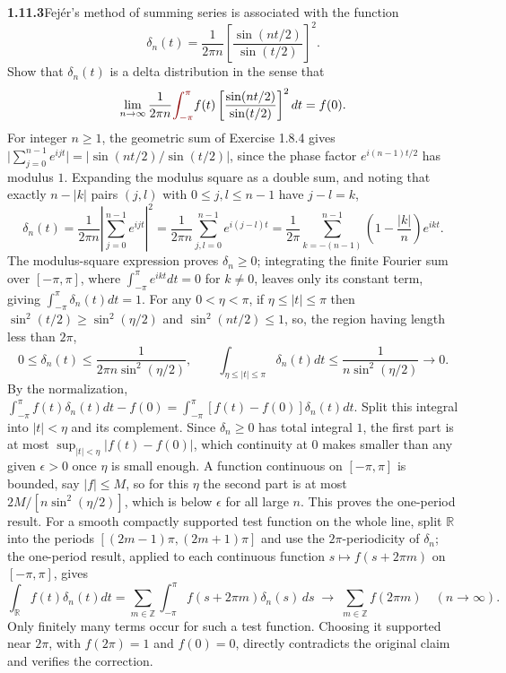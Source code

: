 \par\bigskip
\noindent\textbf{1.11.3}\quad Fej\'er's method of summing series is associated
with the function
\[
\delta_{n}(t)=\frac{1}{2\pi n}\left[\frac{\sin(nt/2)}{\sin(t/2)}\right]^{2}.
\]
Show that $\delta_{n}(t)$ is a delta distribution  in the sense that
\[
\lim_{n\to\infty}\frac{1}{2\pi n}\erratum{\int_{-\pi}^{\pi}}f(t)
\left[\frac{\sin(nt/2)}{\sin(t/2)}\right]^{2}dt=f(0).
\]
\solution
{}
For integer $n\ge1$, the geometric sum of Exercise 1.8.4 gives
$\bigl|\sum_{j=0}^{n-1}e^{ijt}\bigr|=|\sin(nt/2)/\sin(t/2)|$, since
the phase factor $e^{i(n-1)t/2}$ has modulus $1$. Expanding the
modulus square as a double sum, and noting that exactly $n-|k|$ pairs
$(j,l)$ with $0\le j,l\le n-1$ have $j-l=k$,
\[
 \delta_n(t)=\frac1{2\pi n}\left|\sum_{j=0}^{n-1}e^{ijt}\right|^2
 =\frac1{2\pi n}\sum_{j,l=0}^{n-1}e^{i(j-l)t}
 =\frac1{2\pi}\sum_{k=-(n-1)}^{n-1}
                  \left(1-\frac{|k|}{n}\right)e^{ikt}.
\]
The modulus-square expression proves $\delta_n\ge0$; integrating the
finite Fourier sum over $[-\pi,\pi]$, where
$\int_{-\pi}^{\pi}e^{ikt}dt=0$ for $k\ne0$, leaves only its constant
term, giving $\int_{-\pi}^{\pi}\delta_n(t)dt=1$.
For any $0<\eta<\pi$, if $\eta\le|t|\le\pi$ then
$\sin^2(t/2)\ge\sin^2(\eta/2)$ and $\sin^2(nt/2)\le1$, so, the region
having length less than $2\pi$,
\[
 0\le\delta_n(t)\le\frac1{2\pi n\sin^2(\eta/2)},\qquad
 \int_{\eta\le|t|\le\pi}\delta_n(t)dt
       \le\frac1{n\sin^2(\eta/2)}\to0.
\]
By the normalization,
$\int_{-\pi}^{\pi}f(t)\delta_n(t)dt-f(0)
=\int_{-\pi}^{\pi}[f(t)-f(0)]\delta_n(t)dt$. Split this integral into
$|t|<\eta$ and its complement. Since $\delta_n\ge0$ has total integral
$1$, the first part is at most $\sup_{|t|<\eta}|f(t)-f(0)|$, which
continuity at $0$ makes smaller than any given $\epsilon>0$ once $\eta$
is small enough. A function continuous on $[-\pi,\pi]$ is bounded, say
$|f|\le M$, so for this $\eta$ the second part is at most
$2M/[n\sin^2(\eta/2)]$, which is below $\epsilon$ for all large $n$.
This proves the one-period result.
For a smooth compactly supported test function on the whole line,
split $\mathbb R$ into the periods $[(2m-1)\pi,(2m+1)\pi]$ and use the
$2\pi$-periodicity of $\delta_n$; the one-period result, applied to
each continuous function $s\mapsto f(s+2\pi m)$ on $[-\pi,\pi]$, gives
\[
 \int_{\mathbb R} f(t)\delta_n(t)dt
 =\sum_{m\in\mathbb Z}\int_{-\pi}^{\pi}f(s+2\pi m)\delta_n(s)\,ds
 \;\longrightarrow\;\sum_{m\in\mathbb Z} f(2\pi m)
 \quad(n\to\infty).
\]
Only finitely many terms occur for such a test function. Choosing it
supported near $2\pi$, with $f(2\pi)=1$ and $f(0)=0$, directly
contradicts the original claim and verifies the correction.


